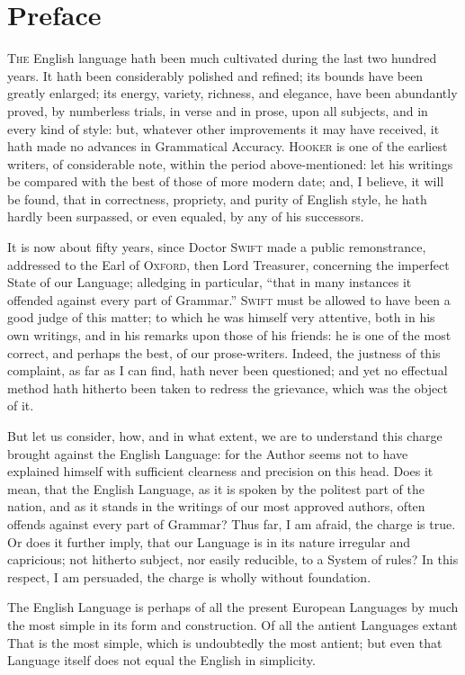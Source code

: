 \chapter{Preface}

\textsc{The} English language hath been much cultivated during the last
two hundred years. It hath been considerably polished and refined; its
bounds have been greatly enlarged; its energy, variety, richness, and
elegance, have been abundantly proved, by numberless trials, in verse
and in prose, upon all subjects, and in every kind of style: but,
whatever other improvements it may have received, it hath made no
advances in Grammatical Accuracy. \textsc{Hooker} is one of the earliest
writers, of considerable note, within the period above-mentioned: let
his writings be compared with the best of those of more modern date;
and, I believe, it will be found, that in correctness, propriety, and
purity of English style, he hath hardly been surpassed, or even equaled,
by any of his successors.

It is now about fifty years, since Doctor \textsc{Swift} made a public
remonstrance, addressed to the Earl of \textsc{Oxford}, then Lord
Treasurer, concerning the imperfect State of our Language; alledging in
particular, ``that in many instances it offended against every part of
Grammar.'' \textsc{Swift} must be allowed to have been a good judge of
this matter; to which he was himself very attentive, both in his own
writings, and in his remarks upon those of his friends: he is one of the
most correct, and perhaps the best, of our prose-writers. Indeed, the
justness of this complaint, as far as I can find, hath never been
questioned; and yet no effectual method hath hitherto been taken to
redress the grievance, which was the object of it.

But let us consider, how, and in what extent, we are to understand this
charge brought against the English Language: for the Author seems not to
have explained himself with sufficient clearness and precision on this
head. Does it mean, that the English Language, as it is spoken by the
politest part of the nation, and as it stands in the writings of our
most approved authors, often offends against every part of Grammar? Thus
far, I am afraid, the charge is true. Or does it further imply, that our
Language is in its nature irregular and capricious; not hitherto
subject, nor easily reducible, to a System of rules? In this respect, I
am persuaded, the charge is wholly without foundation.

The English Language is perhaps of all the present European Languages by
much the most simple in its form and construction. Of all the antient
Languages extant That is the most simple, which is undoubtedly the most
antient; but even that Language itself does not equal the English in
simplicity.

